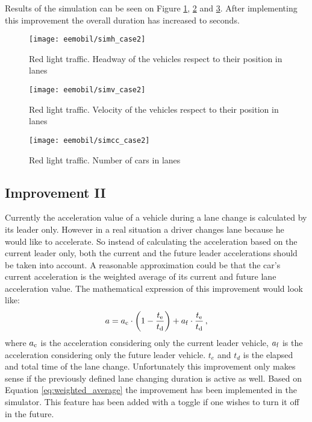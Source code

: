 		Results of the simulation can be seen on Figure \ref{fig:red_light_situationh_impr1}, \ref{fig:red_light_situationv_impr1} and \ref{fig:red_light_situationcc_impr1}. After implementing this improvement the overall duration has increased to seconds.
		\begin{figure}
			\centering
			\texttt{[image: eemobil/simh\_case2]}
			\caption{Red light traffic. Headway of the vehicles respect to their position in lanes}
			\label{fig:red_light_situationh_impr1}
		\end{figure}
		\begin{figure}
			\centering
			\texttt{[image: eemobil/simv\_case2]}
			\caption{Red light traffic. Velocity of the vehicles respect to their position in lanes}
			\label{fig:red_light_situationv_impr1}
		\end{figure}
		\begin{figure}
			\centering
			\texttt{[image: eemobil/simcc\_case2]}
			\caption{Red light traffic. Number of cars in lanes }
			\label{fig:red_light_situationcc_impr1}
		\end{figure}
		\subsection{Improvement II}
		Currently the acceleration value of a vehicle during a lane change is calculated by its leader only. However in a real situation a driver changes lane because he would like to accelerate. So instead of calculating the acceleration based on the current leader only, both the current and the future leader accelerations should be taken into account. A reasonable approximation could be that the car's current acceleration is the weighted average of its current and future lane acceleration value. The mathematical expression of this improvement would look like:
		\begin{equation}
			a=a_{\rm c} \cdot \left(1-\frac{t_{\rm e}}{t_{\rm d}}\right) + a_{\rm f}\cdot \frac{t_{\rm e}}{t_{\rm d}}\,,
			\label{eq:weighted_average}
		\end{equation}
		where $a_{\rm c}$ is the acceleration considering only the current leader vehicle, $a_{\rm f}$  is the acceleration considering only the future leader vehicle. $t_e$ and $t_d$ is the elapsed and total time of the lane change. Unfortunately this improvement only makes sense if the previously defined lane changing duration is active as well. Based on Equation \ref{eq:weighted_average} the improvement has been implemented in the simulator. This feature has been added with a toggle if one wishes to turn it off in the future.
		
